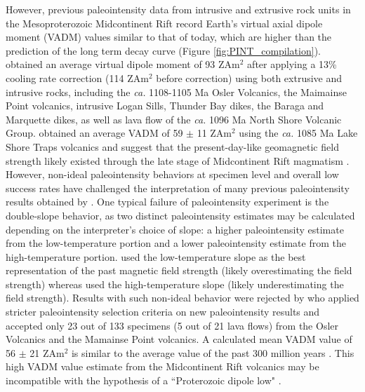 \documentclass[draft]{agujournal2019}
\begin{document}
However, previous paleointensity data from intrusive and extrusive rock units in the Mesoproterozoic Midcontinent Rift \cite{Pesonen1983a, Kulakov2013a, Sprain2018a} record Earth's virtual axial dipole moment (VADM) values similar to that of today, which are higher than the prediction of the long term decay curve (Figure \ref{fig:PINT_compilation}).  obtained an average virtual dipole moment of 93 ZAm$^2$ after applying a 13\% cooling rate correction (114 ZAm$^2$ before correction) using both extrusive and intrusive rocks, including the \textit{ca.} 1108-1105 Ma Osler Volcanics, the Maimainse Point volcanics, intrusive Logan Sills, Thunder Bay dikes, the Baraga and Marquette dikes, as well as lava flow of the \textit{ca.} 1096 Ma North Shore Volcanic Group.  obtained an average VADM of 59 $\pm$ 11 ZAm$^2$ using the \textit{ca.} 1085 Ma Lake Shore Traps volcanics and suggest that the present-day-like geomagnetic field strength likely existed through the late stage of Midcontinent Rift magmatism \cite{Vervoort2007a, Miller2013a}. However, non-ideal paleointensity behaviors at specimen level and overall low success rates have challenged the interpretation of many previous paleointensity results obtained by . One typical failure of paleointensity experiment is the double-slope behavior, as two distinct paleointensity estimates may be calculated depending on the interpreter's choice of slope: a higher paleointensity estimate from the low-temperature portion and a lower paleointensity estimate from the high-temperature portion.  used the low-temperature slope as the best representation of the past magnetic field strength (likely overestimating the field strength) whereas  used the high-temperature slope (likely underestimating the field strength). Results with such non-ideal behavior were rejected by  who applied stricter paleointensity selection criteria on new paleointensity results and accepted only 23 out of 133 specimens (5 out of 21 lava flows) from the Osler Volcanics and the Mamainse Point volcanics. A calculated mean VADM value of 56 $\pm$ 21 ZAm$^2$ is similar to the average value of the past 300 million years \cite{Sprain2018a}. This high VADM value estimate from the Midcontinent Rift volcanics may be incompatible with the hypothesis of a ``Proterozoic dipole low" \cite{Biggin2009a}. 
\end{document}
